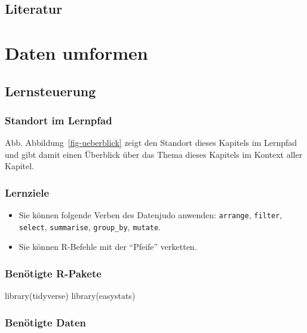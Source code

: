 \documentclass[
  a4paper,
  DIV=11]{scrreprt}
\newenvironment{Shaded}{\begin{snugshade}}{\end{snugshade}}
\newcommand{\FunctionTok}[1]{\textcolor[rgb]{0.28,0.35,0.67}{#1}}
\newcommand{\NormalTok}[1]{\textcolor[rgb]{0.00,0.23,0.31}{#1}}
\providecommand{\tightlist}{%
  \setlength{\itemsep}{0pt}\setlength{\parskip}{0pt}}\usepackage{longtable,booktabs,array}
\theoremstyle{definition}
\theoremstyle{definition}
\theoremstyle{definition}
\theoremstyle{remark}
\begin{document}
\section{Literatur}\label{literatur-1}

\chapter{Daten umformen}\label{daten-umformen}

\section{Lernsteuerung}\label{lernsteuerung-2}

\subsection{Standort im Lernpfad}\label{standort-im-lernpfad-2}

Abb. Abbildung~\ref{fig-ueberblick} zeigt den Standort dieses Kapitels
im Lernpfad und gibt damit einen Überblick über das Thema dieses
Kapitels im Kontext aller Kapitel.

\subsection{Lernziele}\label{lernziele-3}

\begin{itemize}
\tightlist
\item
  Sie können folgende Verben des Datenjudo anwenden: \texttt{arrange},
  \texttt{filter}, \texttt{select}, \texttt{summarise},
  \texttt{group\_by}, \texttt{mutate}.
\item
  Sie können R-Befehle mit der ``Pfeife'' verketten.
\end{itemize}

\subsection{Benötigte R-Pakete}\label{benuxf6tigte-r-pakete-1}

\begin{Shaded}
\begin{Highlighting}[]
\FunctionTok{library}\NormalTok{(tidyverse)}
\FunctionTok{library}\NormalTok{(easystats)}
\end{Highlighting}
\end{Shaded}

\subsection{Benötigte Daten}\label{benuxf6tigte-daten-1}
\end{document}
